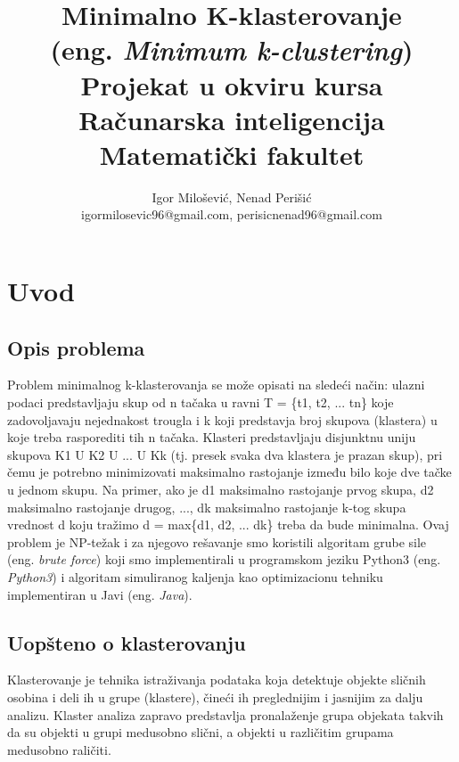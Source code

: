 \documentclass[a4paper]{article}
\begin{document}
\title{Minimalno K-klasterovanje\\ \small(eng. \textit{Minimum k-clustering})\\ \small{Projekat u okviru kursa Računarska inteligencija\\ Matematički fakultet}}

\author{Igor Milošević, Nenad Perišić\\ igormilosevic96@gmail.com, perisicnenad96@gmail.com}


\maketitle

\tableofcontents

\newpage

\section{Uvod}
\subsection{Opis problema}
Problem minimalnog k-klasterovanja se može opisati na sledeći način: ulazni podaci predstavljaju skup od n tačaka u ravni T = \{t1, t2, ... tn\} koje zadovoljavaju nejednakost trougla i k koji predstavja broj skupova (klastera) u koje treba rasporediti tih n tačaka. Klasteri predstavljaju disjunktnu uniju skupova K1 U K2 U ... U Kk (tj. presek svaka dva klastera je prazan skup), pri čemu je potrebno minimizovati maksimalno rastojanje između bilo koje dve tačke u jednom skupu. Na primer, ako je d1 maksimalno rastojanje prvog skupa, d2 maksimalno rastojanje drugog, ..., dk maksimalno rastojanje k-tog skupa vrednost d koju tražimo 
d = max\{d1, d2, ... dk\} treba da bude minimalna. Ovaj problem je NP-težak i za njegovo rešavanje smo koristili algoritam grube sile (eng. \textit{brute force}) koji smo implementirali u programskom jeziku Python3 (eng. \textit{Python3}) i algoritam simuliranog kaljenja kao optimizacionu tehniku implementiran u Javi (eng. \textit{Java}).


\subsection{Uopšteno o klasterovanju}
Klasterovanje je tehnika istraživanja podataka koja detektuje objekte sličnih osobina i deli
ih u grupe (klastere), čineći ih preglednijim i jasnijim za dalju analizu. Klaster analiza zapravo
predstavlja pronalaženje grupa objekata takvih da su objekti u grupi medusobno slični, a objekti
u različitim grupama medusobno raličiti.\cite{aggarwal} \\
\end{document}
